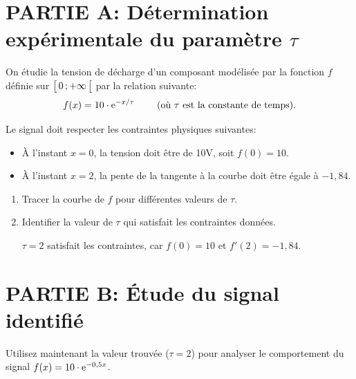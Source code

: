 \documentclass[11pt, a4paper]{report}
\begin{document}
\def\level{BTS}  %
\def\course{CIEL 1}
\def\chaptername{Intégration} %
\def\docname{C107~--~TP2}        %

\pagestyle{DS_FP}

\NomPrenomNote{}


\section*{PARTIE A\@: Détermination expérimentale du paramètre $\tau$}

On étudie la tension de décharge d'un composant modélisée par la fonction $f$ définie sur $\bigl[ \, 0 \, ; +\infty \,\bigl[$ par la relation suivante:
\[f(x) = 10\cdot \mathrm{e}^{-x/\tau} \qquad \text{ (où $\tau$ est la constante de temps).}\]

Le signal doit respecter les contraintes physiques suivantes:

\begin{itemize}
    \item À l'instant $x=0$, la tension doit être de 10V, soit $f(0) = 10$.
    \item À l'instant $x=2$, la pente de la tangente à la courbe doit être égale à $-1,84$.
\end{itemize}

\begin{enumerate}
    \item Tracer la courbe de $f$ pour différentes valeurs de $\tau$.  
    \item Identifier la valeur de $\tau$ qui satisfait les contraintes données.  
    \begin{blocvisible}[height=1]
        $\tau = 2$ satisfait les contraintes, car $f(0) = 10$ et $f'(2) = -1,84$.
    \end{blocvisible}
\end{enumerate}


\section*{PARTIE B\@: Étude du signal identifié}

Utilisez maintenant la valeur trouvée ($\tau = 2$) pour analyser le comportement du signal $f(x) = 10\cdot \mathrm{e}^{-0,5x}$.
\end{document}
